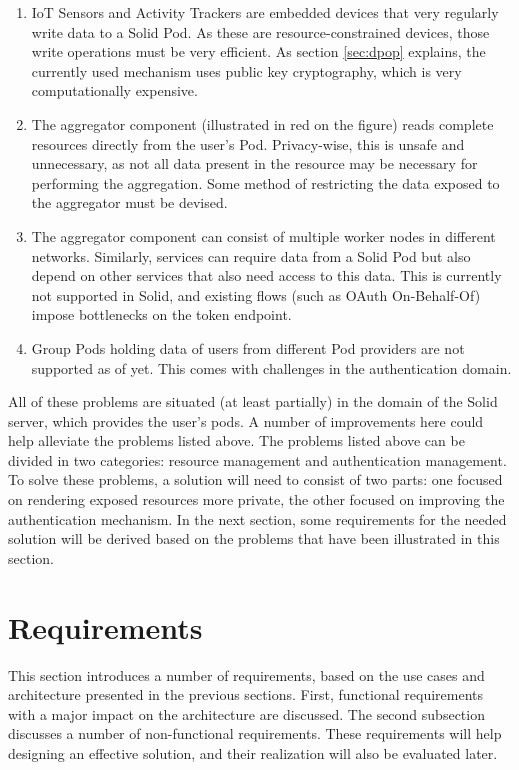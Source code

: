 \begin{enumerate}
    \item IoT Sensors and Activity Trackers are embedded devices that very regularly write data to a Solid Pod. As these are resource-constrained devices, those write operations must be very efficient. As section \ref{sec:dpop} explains, the currently used mechanism uses public key cryptography, which is very computationally expensive.
    \item The aggregator component (illustrated in red on the figure) reads complete resources directly from the user's Pod. Privacy-wise, this is unsafe and unnecessary, as not all data present in the resource may be necessary for performing the aggregation. Some method of restricting the data exposed to the aggregator must be devised.
    \item The aggregator component can consist of multiple worker nodes in different networks. Similarly, services can require data from a Solid Pod but also depend on other services that also need access to this data. This is currently not supported in Solid, and existing flows (such as OAuth On-Behalf-Of) impose bottlenecks on the token endpoint. 
    \item Group Pods holding data of users from different Pod providers are not supported as of yet. This comes with challenges in the authentication domain.
\end{enumerate}

\noindent All of these problems are situated (at least partially) in the domain of the Solid server, which provides the user's pods. A number of improvements here could help alleviate the problems listed above. The problems listed above can be divided in two categories: resource management and authentication management. To solve these problems, a solution will need to consist of two parts: one focused on rendering exposed resources more private, the other focused on improving the authentication mechanism. In the next section, some requirements for the needed solution will be derived based on the problems that have been illustrated in this section.

\section{Requirements}
\label{sec:requirements}
This section introduces a number of requirements, based on the use cases and architecture presented in the previous sections. First, functional requirements with a major impact on the architecture are discussed. The second subsection discusses a number of non-functional requirements. These requirements will help designing an effective solution, and their realization will also be evaluated later.

